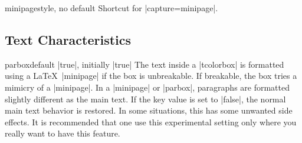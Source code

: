 \begin{docTcbKey}{minipage}{}{style, no default}
  Shortcut for |capture=minipage|.
\end{docTcbKey}


\clearpage
\subsection{Text Characteristics}
\begin{docTcbKey}{parbox}{}{default |true|, initially |true|}
  The text inside a |tcolorbox| is formatted using a \LaTeX\ |minipage|
  if the box is unbreakable. If breakable, the box tries a mimicry of
  a |minipage|. In a |minipage| or |parbox|, paragraphs are formatted slightly different
  as the main text. If the key value is set to |false|, the normal main text
  behavior is restored. In some situations, this has some unwanted side
  effects. It is recommended that one use this experimental setting only
  where you really want to have this feature.
\end{docTcbKey}

\begin{dispListing}

\begin{tcolorbox}[parbox,adjusted title={parbox=true (normal)}]
  \lipsum[1-2]
\end{tcolorbox}\hfill%
\begin{tcolorbox}[parbox=false,adjusted title={parbox=false}]
  \lipsum[1-2]
\end{tcolorbox}%
\end{dispListing}
{\tcbusetemp}


